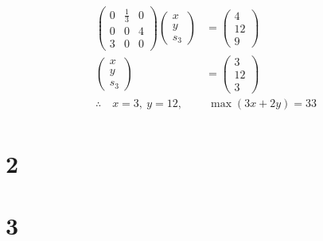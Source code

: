 \documentclass[a4paper,12pt]{article}
\begin{document}
\begin{align*}
    \begin{pmatrix}0 & \frac{1}{3} & 0\\0 & 0 &4\\3 & 0 & 0\end{pmatrix} \begin{pmatrix}x\\y\\s_3\end{pmatrix} & = \begin{pmatrix}4\\12\\9\end{pmatrix} \\
    \begin{pmatrix}x\\y\\s_3\end{pmatrix}                                                                      & = \begin{pmatrix}3\\12\\3\end{pmatrix} \\
    \therefore \quad x = 3, \ y = 12,                                                                          & \ \max{(3 x + 2 y)} = 33               \\
\end{align*}

\section*{2}

\section*{3}
\end{document}
